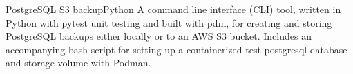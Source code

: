 \datedsubsection{}
{PostgreSQL S3 backup}{\href{https://github.com/JacobArchambault?tab=repositories&q=&type=&language=python&sort=}{Python}}
{A command line interface (CLI) \href{https://github.com/JacobArchambault/pgbackup}{tool}, written in Python with pytest unit testing and built with pdm, for creating and storing PostgreSQL backups either locally or to an AWS S3 bucket. Includes an accompanying bash script for setting up a containerized test postgresql database and storage volume with Podman.}
